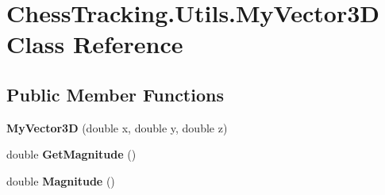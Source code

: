 \hypertarget{class_chess_tracking_1_1_utils_1_1_my_vector3_d}{}\section{Chess\+Tracking.\+Utils.\+My\+Vector3D Class Reference}
\label{class_chess_tracking_1_1_utils_1_1_my_vector3_d}
\subsection*{Public Member Functions}
\begin{DoxyCompactItemize}
\item 
\mbox{\label{class_chess_tracking_1_1_utils_1_1_my_vector3_d_ac9e7fe740df6d55a35ae85de90e037f5}} 
{\bfseries My\+Vector3D} (double x, double y, double z)
\item 
\mbox{\label{class_chess_tracking_1_1_utils_1_1_my_vector3_d_afd4396fba9a01c6bcfc828f5240b0ce5}} 
double {\bfseries Get\+Magnitude} ()
\item 
\mbox{\label{class_chess_tracking_1_1_utils_1_1_my_vector3_d_a78ac1d527c93e2c6be925ab811305a75}} 
double {\bfseries Magnitude} ()
\end{DoxyCompactItemize}
